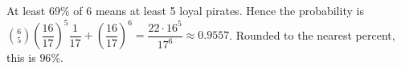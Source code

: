 At least $69\%$ of 6 means at least 5 loyal pirates. Hence the probability is $\binom65\left(\dfrac{16}{17}\right)^5\dfrac{1}{17}+\left(\dfrac{16}{17}\right)^6=\dfrac{22\cdot16^5}{17^6}\approx0.9557$. Rounded to the nearest percent, this is $\boxed{96\%}$.
